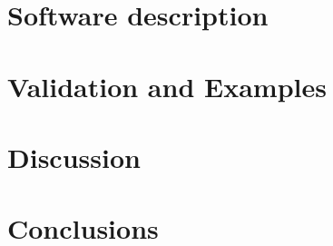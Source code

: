 \documentclass[preprint,12pt,letterpaper]{elsarticle}
\begin{document}

\section{Software description}
\label{s:architecture}

%
%


\section{Validation and Examples}
\label{s:examples}



\section{Discussion}
\label{s:discussion}

%
%
%
%
%


\section{Conclusions}
\label{s:conclusions}
\end{document}
